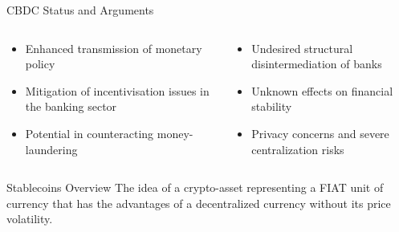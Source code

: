 \documentclass[handout]{beamer}
\begin{document}
\begin{frame}{CBDC Status and Arguments}
{\begin{columns}[T]
	\begin{column}{0.45\textwidth}
	\footnotesize{
		\begin{itemize}
			\item Enhanced transmission of monetary policy
			\item Mitigation of incentivisation issues in the banking sector
			\item Potential in counteracting money-laundering
		\end{itemize}
		}
	\end{column}
	\begin{column}{0.45\textwidth}
	\footnotesize{
		\begin{itemize}
			\item Undesired structural disintermediation of banks 
			\item Unknown effects on financial stability
			\item Privacy concerns and severe centralization risks
		\end{itemize}
		}
	\end{column}
\end{columns}
}

\end{frame}

\begin{frame}{Stablecoins Overview}
The idea of a crypto-asset representing \color{focus} a FIAT unit of currency \color{black} that has the advantages of a decentralized currency without its \color{focus}price volatility\color{black}.

\vspace{1.5em}


\end{frame}
\end{document}
